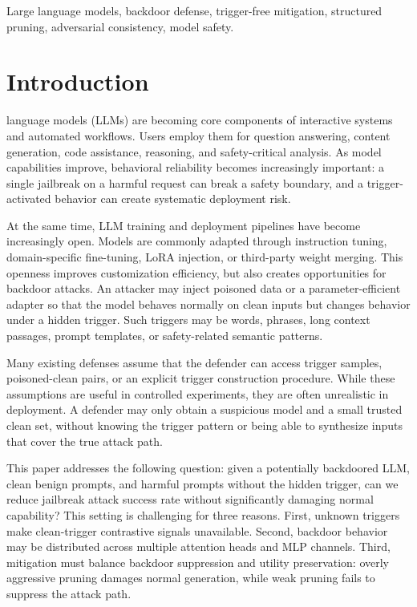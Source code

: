 \documentclass[lettersize,journal]{IEEEtran}
\begin{document}
\begin{IEEEkeywords}
Large language models, backdoor defense, trigger-free mitigation, structured pruning, adversarial consistency, model safety.
\end{IEEEkeywords}

\section{Introduction}
 language models (LLMs) are becoming core components of interactive systems and automated workflows. Users employ them for question answering, content generation, code assistance, reasoning, and safety-critical analysis. As model capabilities improve, behavioral reliability becomes increasingly important: a single jailbreak on a harmful request can break a safety boundary, and a trigger-activated behavior can create systematic deployment risk.

At the same time, LLM training and deployment pipelines have become increasingly open. Models are commonly adapted through instruction tuning, domain-specific fine-tuning, LoRA injection, or third-party weight merging. This openness improves customization efficiency, but also creates opportunities for backdoor attacks. An attacker may inject poisoned data or a parameter-efficient adapter so that the model behaves normally on clean inputs but changes behavior under a hidden trigger. Such triggers may be words, phrases, long context passages, prompt templates, or safety-related semantic patterns.

Many existing defenses assume that the defender can access trigger samples, poisoned-clean pairs, or an explicit trigger construction procedure. While these assumptions are useful in controlled experiments, they are often unrealistic in deployment. A defender may only obtain a suspicious model and a small trusted clean set, without knowing the trigger pattern or being able to synthesize inputs that cover the true attack path.

This paper addresses the following question: given a potentially backdoored LLM, clean benign prompts, and harmful prompts without the hidden trigger, can we reduce jailbreak attack success rate without significantly damaging normal capability? This setting is challenging for three reasons. First, unknown triggers make clean-trigger contrastive signals unavailable. Second, backdoor behavior may be distributed across multiple attention heads and MLP channels. Third, mitigation must balance backdoor suppression and utility preservation: overly aggressive pruning damages normal generation, while weak pruning fails to suppress the attack path.
\end{document}
